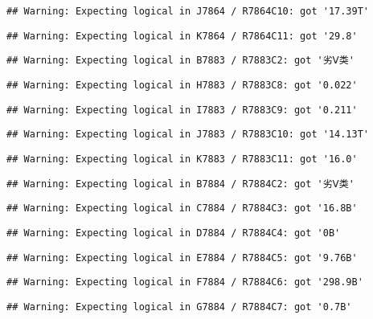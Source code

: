 \documentclass[
]{article}
\begin{document}
\begin{verbatim}
## Warning: Expecting logical in J7864 / R7864C10: got '17.39T'
\end{verbatim}

\begin{verbatim}
## Warning: Expecting logical in K7864 / R7864C11: got '29.8'
\end{verbatim}

\begin{verbatim}
## Warning: Expecting logical in B7883 / R7883C2: got '劣Ⅴ类'
\end{verbatim}

\begin{verbatim}
## Warning: Expecting logical in H7883 / R7883C8: got '0.022'
\end{verbatim}

\begin{verbatim}
## Warning: Expecting logical in I7883 / R7883C9: got '0.211'
\end{verbatim}

\begin{verbatim}
## Warning: Expecting logical in J7883 / R7883C10: got '14.13T'
\end{verbatim}

\begin{verbatim}
## Warning: Expecting logical in K7883 / R7883C11: got '16.0'
\end{verbatim}

\begin{verbatim}
## Warning: Expecting logical in B7884 / R7884C2: got '劣Ⅴ类'
\end{verbatim}

\begin{verbatim}
## Warning: Expecting logical in C7884 / R7884C3: got '16.8B'
\end{verbatim}

\begin{verbatim}
## Warning: Expecting logical in D7884 / R7884C4: got '0B'
\end{verbatim}

\begin{verbatim}
## Warning: Expecting logical in E7884 / R7884C5: got '9.76B'
\end{verbatim}

\begin{verbatim}
## Warning: Expecting logical in F7884 / R7884C6: got '298.9B'
\end{verbatim}

\begin{verbatim}
## Warning: Expecting logical in G7884 / R7884C7: got '0.7B'
\end{verbatim}
\end{document}
